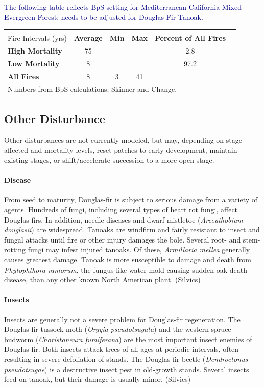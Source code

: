 \documentclass{article}
\newcommand{\mcomment}[1]{\textcolor{navy}{#1}}
\begin{document}
\mcomment{The following table reflects BpS setting for Mediterranean California Mixed Evergreen Forest; needs to be adjusted for Douglas Fir-Tanoak.}
\begin{center}
\vspace{.1in}
\begin{tabular}{l|ccccc}
\hline 
\\[-2ex]
 \large Fire Intervals {\small(yrs)} & \textbf{Average} & \textbf{Min} & \textbf{Max} & \textbf{Percent of All Fires} \\
 \hline
 \textbf{High Mortality}	& 75 	& 		& 		& 2.8 	\\
 \textbf{Low Mortality} 	& 8 		& 		& 		& 97.2 	\\
 \textbf{All Fires} 		& 8 		& 	 3	& 41	 	& 		\\
 \multicolumn{5}{l}{\small Numbers from BpS calculations; Skinner and Change.}\\
\hline
\end{tabular}
\end{center}

\subsection*{Other Disturbance}
Other disturbances are not currently modeled, but may, depending on stage affected and mortality levels, reset patches to early development, maintain existing stages, or shift/accelerate succession to a more open stage.

\paragraph{Disease} From seed to maturity, Douglas-fir is subject to serious damage from a variety of agents. Hundreds of fungi, including several types of heart rot fungi, affect Douglas firs. In addition, needle diseases and dwarf mistletoe (\emph{Arceuthobium douglasii}) are widespread. Tanoaks are windfirm and fairly resistant to insect and fungal attacks until fire or other injury damages the bole. Several root- and stem-rotting fungi may infest injured tanoaks. Of these, \emph{Armillaria mellea} generally causes greatest damage.  Tanoak is more susceptible to damage and death from \emph{Phytophthora ramorum}, the fungus-like water mold causing sudden oak death disease, than any other known North American plant. (Silvics)

\paragraph{Insects} Insects are generally not a severe problem for Douglas-fir regeneration. The Douglas-fir tussock moth (\emph{Orgyia pseudotsugata}) and the western spruce budworm (\emph{Choristoneura fumiferana}) are the most important insect enemies of Douglas fir. Both insects attack trees of all ages at periodic intervals, often resulting in severe defoliation of stands. The Douglas-fir beetle (\emph{Dendroctonus pseudotsugae}) is a destructive insect pest in old-growth stands. Several insects feed on tanoak, but their damage is usually minor. (Silvics)
\end{document}
